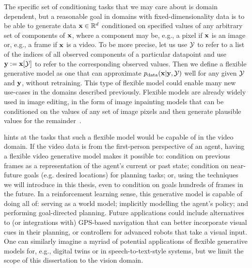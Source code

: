 The specific set of conditioning tasks that we may care about is domain dependent, but a reasonable goal in domains with fixed-dimensionality data is to be able to generate data ${\mathbf{x}} \in \mathbb{R}^d$ conditioned on specified values of any arbitrary set of components of ${\mathbf{x}}$, where a component may be, e.g., a pixel if ${\mathbf{x}}$ is an image or, e.g., a frame if ${\mathbf{x}}$ is a video. To be more precise,
let us use ${\mathcal{Y}}$ to refer to a list of the indices of all observed components of a particular datapoint and use ${\mathbf{y}} := {\mathbf{x}}[{\mathcal{Y}}]$ to refer to the corresponding observed values. Then we define a flexible generative model as one that can approximate $p_{\rm{data}}({\mathbf{x}}|{\mathbf{y}},{\mathcal{Y}})$ well for any given ${\mathcal{Y}}$ and ${\mathbf{y}}$, without retraining.
This type of flexible model could enable many new use-cases in the domains described previously. Flexible models are already widely used in image editing, in the form of image inpainting models that can be conditioned on the values of any set of image pixels and then generate plausible values for the remainder~\citep{rombach2022high,zhao2021large,harvey2021conditional}.

 hints at the tasks that such a flexible model would be capable of in the video domain. If the video data is from the first-person perspective of an agent, having a flexible video generative model makes it possible to: condition on previous frames as a representation of the agent's current or past state; condition on near-future goals (e.g. desired locations) for planning tasks; or, using the techniques we will introduce in this thesis, even to condition on goals hundreds of frames in the future. In a reinforcement learning sense, this generative model is capable of doing all of: serving as a world model; implicitly modelling the agent's policy; and performing goal-directed planning. Future applications could include alternatives to (or integrations with) GPS-based navigation that can better incorporate visual cues in their planning, or controllers for advanced robots that take a visual input. One can similarly imagine a myriad of potential applications of flexible generative models for, e.g., digital twins or in speech-to-text-style systems, but we limit the scope of this dissertation to the vision domain.

